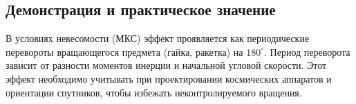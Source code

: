\documentclass[12pt, a4paper]{article}
\begin{document}
\subsection{Демонстрация и практическое значение}
В условиях невесомости (МКС) эффект проявляется как периодические перевороты вращающегося предмета (гайка, ракетка) на $180^\circ$. Период переворота зависит от разности моментов инерции и начальной угловой скорости. Этот эффект необходимо учитывать при проектировании космических аппаратов и ориентации спутников, чтобы избежать неконтролируемого вращения.
\end{document}

